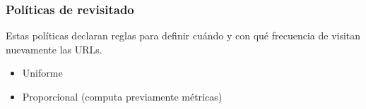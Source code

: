 \documentclass[
10pt, %
aspectratio=169, %
]{beamer}
\begin{document}
	\begin{frame}
		
		\frametitle{Políticas de revisitado}
		
		Estas políticas declaran reglas para definir cuándo y con qué frecuencia de visitan nuevamente las URLs.
		
		\vspace{2\baselineskip}
		
		\begin{itemize}
			\item Uniforme
			
			\item Proporcional (computa previamente métricas)
		\end{itemize}
		
	\end{frame}
	
\end{document}
